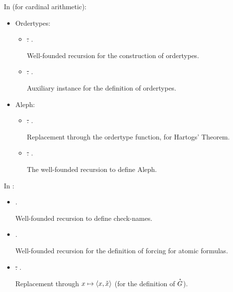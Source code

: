 In  (for cardinal arithmetic):
\begin{itemize}
\item Ordertypes:
  \begin{itemize}
  \item
    \sout{.}
    .

    Well-founded recursion for the construction of ordertypes.
  \item
    \sout{.}
    .
    
    Auxiliary instance for the definition of ordertypes.
  \end{itemize}
\item Aleph:
  \begin{itemize}
  \item
    \sout{.}
    .

    Replacement through the ordertype function, for Hartogs' Theorem.
  \item
    \sout{.}
    .

    The well-founded recursion to define Aleph.
  \end{itemize}
\end{itemize}

In :

\begin{itemize}
\item {}.
  
  Well-founded recursion to define check-names.
\item {}.

  Well-founded recursion for the definition of forcing for atomic formulas.
\item
  \sout{.}
  .

  Replacement through $x\mapsto \langle x,\check{x}\rangle$ (for the
  definition of $\punto{G}$).
\end{itemize}

